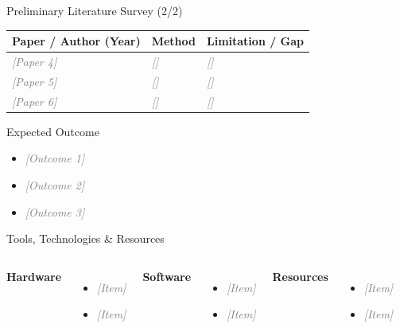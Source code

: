 \documentclass[aspectratio=169,11pt]{beamer}
\newcommand{\placeholder}[1]{\textcolor{gray}{\textit{[#1]}}}
\begin{document}
\begin{frame}{Preliminary Literature Survey (2/2)}
  \small
  \begin{tabular}{@{}p{}p{}p{}@{}}
    \toprule
    \textbf{Paper / Author (Year)} & \textbf{Method} & \textbf{Limitation / Gap} \\
    \midrule
    \placeholder{Paper 4} & \placeholder{} & \placeholder{} \\
    \placeholder{Paper 5} & \placeholder{} & \placeholder{} \\
    \placeholder{Paper 6} & \placeholder{} & \placeholder{} \\
    \bottomrule
  \end{tabular}
\end{frame}

\begin{frame}{Expected Outcome}
  \begin{itemize}
    \item \placeholder{Outcome 1}
    \item \placeholder{Outcome 2}
    \item \placeholder{Outcome 3}
  \end{itemize}
\end{frame}

\begin{frame}{Tools, Technologies \& Resources}
  \begin{columns}[T]
      \textbf{Hardware}
      \begin{itemize}
        \item \placeholder{Item}
        \item \placeholder{Item}
      \end{itemize}
      \textbf{Software}
      \begin{itemize}
        \item \placeholder{Item}
        \item \placeholder{Item}
      \end{itemize}
      \textbf{Resources}
      \begin{itemize}
        \item \placeholder{Item}
        \item \placeholder{Item}
      \end{itemize}
  \end{columns}
\end{frame}
\end{document}
